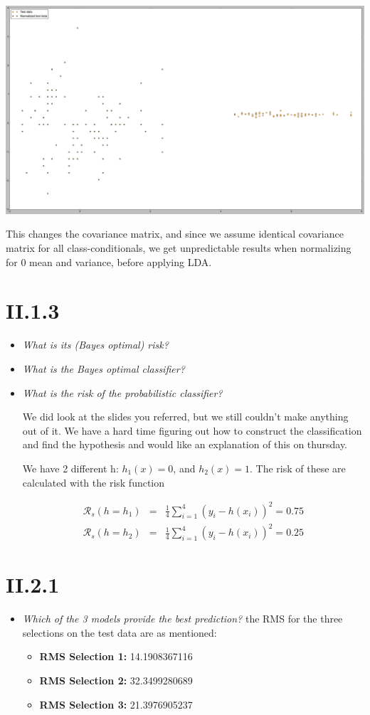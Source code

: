\documentclass[12pt, a4paper]{article}
\begin{document}
\includegraphics[scale=0.25]{lda_normalized_side.png}

This changes the covariance matrix, and since we assume identical covariance matrix for all class-conditionals, we get unpredictable results when normalizing for 0 mean and variance, before applying LDA.

\section{II.1.3}
\begin{itemize}
\item \textit{What is its (Bayes optimal) risk?}
\item \textit{What is the Bayes optimal classifier?}
\item \textit{What is the risk of the probabilistic classifier?}

We did look at the slides you referred, but we still couldn't make anything out of it. We have a hard time figuring out how to construct the classification and find the hypothesis and would like an explanation of this on thursday.

We have 2 different h: $h_1(x) = 0$, and $h_2(x) = 1$. The risk of these are calculated with the risk function

\begin{eqnarray}
	\mathcal{R}_s(h = h_1) &=& \frac{1}{4} \sum^4_{i=1} (y_i - h(x_i))^2 = 0.75 \\
	\mathcal{R}_s(h = h_2) &=& \frac{1}{4} \sum^4_{i=1} (y_i - h(x_i))^2 = 0.25
\end{eqnarray}

\end{itemize}

\section{II.2.1}
\begin{itemize}
\item \textit{Which of the 3 models provide the best prediction?}
the RMS for the three selections on the test data are as mentioned:
\begin{itemize}
\item \textbf{RMS Selection 1:} 14.1908367116
\item \textbf{RMS Selection 2:} 32.3499280689 
\item \textbf{RMS Selection 3:} 21.3976905237
\end{itemize}
\end{itemize}
\end{document}
